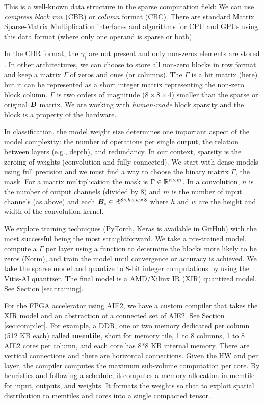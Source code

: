 \documentclass[conference]{IEEEtran}
\begin{document}
This is a well-known data structure in the sparse computation field:
We can use {\em compress block row} (CBR) or {\em column} format
(CBC). There are standard Matrix Sparse-Matrix Multiplication
interfaces and algorithms for CPU and GPUs using this data format
(where only one operand is sparse or both).

In the CBR format, the $\gamma_i$ are not present and only non-zeros
elements are stored \cite{rocSPARSE,cuSPARSE}. In other architectures,
we can choose to store all non-zero blocks in row format and keep a
matrix $\Gamma$ of zeros and ones (or columns). The $\Gamma$ is a bit
matrix (here) but it can be represented as a short integer matrix
representing the non-zero block column. $\Gamma$ is two orders of
magnitude ($8\times 8 \times 4$) smaller than the sparse or original
${\boldsymbol B}$ matrix. We are working with {\em human-made} block sparsity
and the block is a property of the hardware.

In classification, the model weight size determines one important
aspect of the model complexity: the number of operations per single
output, the relation between layers (e.g., depth), and redundancy.  In
our context, sparsity is the zeroing of weights (convolution and fully
connected). We start with dense models using full precision and we
must find a way to choose the binary matrix $\Gamma$, the mask. For a
matrix multiplication the mask is $\Gamma \in \mathbb{R}^{n\times m}$. In a
convolution, $n$ is the number of output channels (divided by 8) and
$m$ is the number of input channels (as above) and each ${\boldsymbol B}_i \in
\mathbb{R}^{8\times h \times w \times 8}$ where $h$ and $w$ are the height and
width of the convolution kernel.


We explore training techniques (PyTorch, Keras is available in GitHub)
with the most successful being the most straightforward. We take a
pre-trained model, compute a $\Gamma$ per layer using a function to
determine the blocks more likely to be zeros (Norm), and train the
model until convergence or accuracy is achieved. We take the sparse
model and quantize to 8-bit integer computations by using the Vitis-AI
quantizer. The final model is a AMD/Xilinx IR (XIR) quantized model. See
Section \ref{sec:training}.

For the FPGA accelerator using AIE2, we have a custom compiler that
takes the XIR model and an abstraction of a connected set of AIE2. See
Section \ref{sec:compiler}. For example, a DDR, one or two memory
dedicated per column (512 KB each) called {\bf memtile}, short for
memory tile, 1 to 8 columns, 1 to 8 AIE2 cores per column, and each
core has 8*8 KB internal memory. There are vertical connections and
there are horizontal connections. Given the HW and per layer, the
compiler computes the maximum sub-volume computation per core. By
heuristics and following a schedule, it computes a memory allocation
in memtile for input, outputs, and weights. It formats the weights so
that to exploit spatial distribution to memtiles and cores into a
single compacted tensor.
\end{document}

